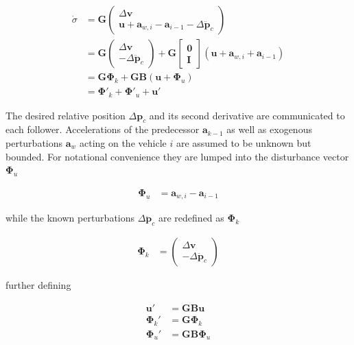 \documentclass{ifacconf}
\providecommand{\mbf}[1]{\mathbf{#1}}
\newcommand{\idxFollower}{{\ensuremath{i} }}
\newcommand{\idxPredecessor}{{\ensuremath{i-1} }}
\begin{document}
\begin{align}
\dot{{\sigma}} &= \mbf{G}
\begin{pmatrix}
\Delta \mbf{v} \\
\mbf{u} + \mbf{a}_{w,\idxFollower}
 - \mbf{a}_\idxPredecessor -  \Delta \ddot{\mbf{p}}_c
\end{pmatrix}\\
& = \mbf{G}
\begin{pmatrix}
\Delta \mbf{v} \\
 - \Delta \ddot{\mbf{p}}_c
\end{pmatrix} 
+ \mbf{G}
\begin{bmatrix}
{\mbf{0}}\\
{\mbf{I}}
\end{bmatrix}
(\mbf{u} + \mbf{a}_{w,\idxFollower} + \mbf{a}_\idxPredecessor) \\
&= \mbf{G} \mbf{\Phi}_k + \mbf{G} \mbf{B}(
\mbf{u}
 + {\mbf\Phi}_u)
\label{eq:sigmadynconti}\\
&= \mbf{\Phi}'_k + \mbf{\Phi}'_u + \mbf{u}'
\label{eq:sigmadyncontishort}
\end{align}

The  desired relative position $\Delta \mbf{p}_c$ and its second derivative are communicated to each follower. Accelerations of the predecessor $\mbf{a}_{k-1}$ as well as exogenous perturbations $\mbf{a}_w $ acting on the vehicle $i$ are assumed to be unknown but bounded. For notational convenience they are lumped into the disturbance vector $\mbf{\Phi}_u$

\begin{align}
\mbf{\Phi}_u &= \mbf{a}_{w,\idxFollower} - \mbf{a}_\idxPredecessor
\end{align}

while the known perturbations $\Delta \ddot{\mbf{p}}_c$ are redefined as $\mbf{\Phi}_k$

\begin{align}
\mbf{\Phi}_k &= 
\begin{pmatrix}
\Delta \mbf{v} \\
 - \Delta \ddot{\mbf{p}}_c
\end{pmatrix} 
\end{align}

further defining

\begin{align}
\mbf{u}' &= \mbf{GB}\mbf{u}
\label{eq:defu}\\
\mbf{\Phi}_k' &= \mbf{G}\mbf{\Phi}_k \\
\mbf{\Phi}_u' &= \mbf{GB}\mbf{\Phi}_u
\end{align}
\end{document}
